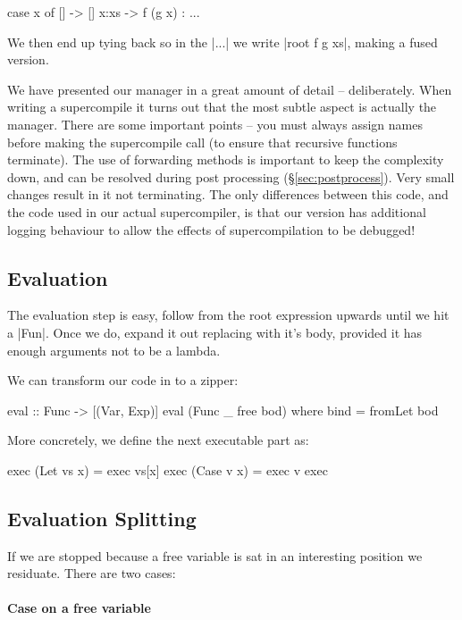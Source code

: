\documentclass{sigplanconf}
\begin{document}
\begin{code}
case x of
   [] -> []
   x:xs -> f (g x) : ...
\end{code}

We then end up tying back so in the |...| we write |root f g xs|, making a fused version.

We have presented our manager in a great amount of detail -- deliberately. When writing a supercompile it turns out that the most subtle aspect is actually the manager. There are some important points -- you must always assign names before making the supercompile call (to ensure that recursive functions terminate). The use of forwarding methods is important to keep the complexity down, and can be resolved during post processing (\S\ref{sec:postprocess}). Very small changes result in it not terminating. The only differences between this code, and the code used in our actual supercompiler, is that our version has additional logging behaviour to allow the effects of supercompilation to be debugged!

\subsection{Evaluation}
\label{sec:eval}

The evaluation step is easy, follow from the root expression upwards until we hit a |Fun|. Once we do, expand it out replacing with it's body, provided it has enough arguments not to be a lambda.

We can transform our code in to a zipper:

\begin{code}
eval :: Func -> [(Var, Exp)]
eval (Func _ free bod)
    where bind = fromLet bod
\end{code}

More concretely, we define the next executable part as:

\begin{code}
exec (Let vs x) = exec vs[x]
exec (Case v x) = exec v
exec 
\end{code}


\subsection{Evaluation Splitting}
\label{sec:eval_split}

If we are stopped because a free variable is sat in an interesting position we residuate. There are two cases:

\paragraph{Case on a free variable}
\end{document}

